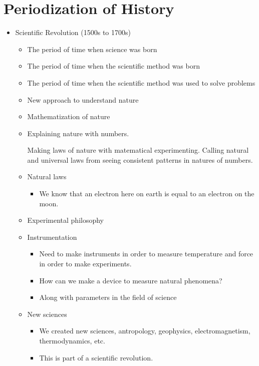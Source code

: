 \documentclass{article}
\begin{document}
\section*{Periodization of History}
\begin{itemize}
  \item Scientific Revolution (1500s to 1700s)
    \begin{itemize}
      \item The period of time when science was born
      \item The period of time when the scientific method was born
      \item The period of time when the scientific method was used
        to solve problems
      \item New approach to understand nature
      \item Mathematization of nature
      \item Explaining nature with numbers.

        Making laws of nature with matematical experimenting.
        Calling natural and universal laws from seeing consistent
        patterns in natures of numbers.
      \item Natural laws
        \begin{itemize}
          \item We know that an electron here on earth
            is equal to an electron on the moon.
        \end{itemize}
      \item Experimental philosophy
      \item Instrumentation
        \begin{itemize}
          \item Need to make instruments in order to measure temperature
            and force in order to make experiments.
          \item How can we make a device to measure natural phenomena?
          \item Along with parameters in the field of science
        \end{itemize}
      \item New sciences
        \begin{itemize}
          \item We created new sciences, antropology, geophysics,
            electromagnetism, thermodynamics, etc.
          \item This is part of a scientific revolution.


\end{itemize}
\end{itemize}
\end{itemize}
\end{document}
